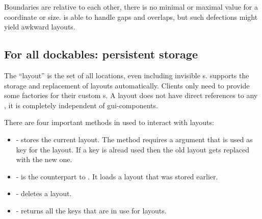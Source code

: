 Boundaries are relative to each other, there is no minimal or maximal value for a coordinate or size.  is able to handle gaps and overlaps, but such defections might yield awkward layouts.




\subsection{For all dockables: persistent storage} \label{sec:layout}
The ``layout'' is the set of all locations, even including invisible s.  supports the storage and replacement of layouts automatically. \linebreak Clients only need to provide some factories for their custom s. A layout does not have direct references to any , it is completely independent of gui-components.

There are four important methods in  used to interact with layouts:
\begin{itemize}
 \item {} - stores the current layout. The method requires a  argument that is used as key for the layout. If a key is alread used then the old layout gets replaced with the new one.
 \item {} - is the counterpart to . It loads a layout that was stored earlier.
 \item {} - deletes a layout.
 \item {} - returns all the keys that are in use for layouts.
\end{itemize}

